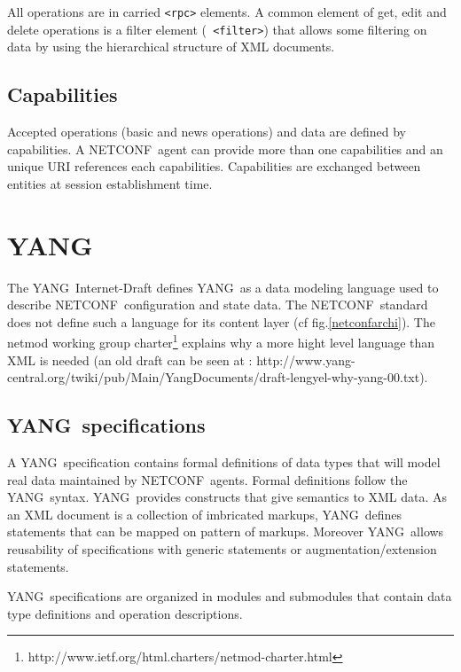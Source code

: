 \documentclass[a4paper]{article}
\newcommand{\nc}{NETCONF}
\newcommand{\y}{YANG}
\begin{document}
All operations are  in carried {\tt <rpc>} elements.  A common element
of  get,  edit  and  delete  operations  is  a  filter  element  ({\tt
<filter>})  that   allows  some  filtering   on  data  by   using  the
hierarchical structure of XML documents.

\subsection{Capabilities}
\label{capabilities}

Accepted operations  (basic and news operations) and  data are defined
by capabilities.  A \nc\ agent  can provide more than one capabilities
and  an unique  URI  references each  capabilities.  Capabilities  are
exchanged between entities at session establishment time.


\section{\y}
\label{yang}

The  \y\ Internet-Draft\cite{yang01}  defines \y\  as a  data modeling
language used to describe \nc\  configuration and state data. The \nc\
standard does  not define  such a language  for its content  layer (cf
fig.\ref{netconfarchi}).       The      netmod      working      group
charter\footnote{http://www.ietf.org/html.charters/netmod-charter.html}
explains why  a more hight level  language than XML is  needed (an old
draft           can          be           seen           at          :
http://www.yang-central.org/twiki/\-pub/\-Main/\-Yang\-Do\-cu\-ments/draft-lengyel-why-yang-00.txt).


\subsection{\y\ specifications}

A  \y\ specification contains  formal definitions  of data  types that
will model  real data maintained  by \nc\ agents.   Formal definitions
follow the \y\ syntax. \y\  provides constructs that give semantics to
XML data.  As an XML document  is a collection  of imbricated markups,
\y\   defines  statements   that   can  be   mapped   on  pattern   of
markups.  Moreover  \y\  allows  reusability  of  specifications  with
generic statements or augmentation/extension statements.

\y\ specifications are organized in modules and submodules
that contain data type definitions and operation descriptions. 
\end{document}
